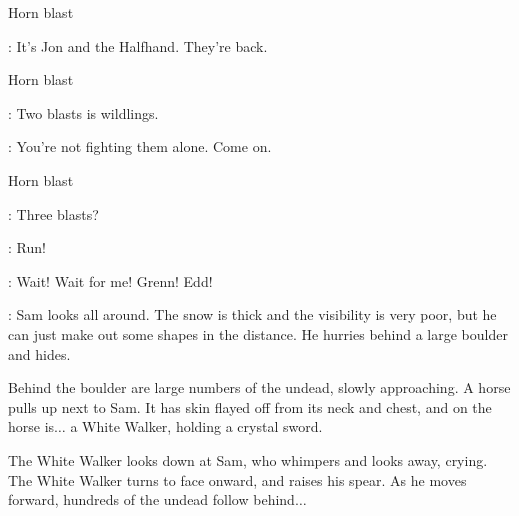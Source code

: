 \sfx Horn blast

\SAM: It's Jon and the Halfhand. They're back.

\sfx Horn blast 

\GRENN:  Two blasts is wildlings. 

\EDD: You're not fighting them alone. Come on. 

\sfx Horn blast


\GRENN: Three blasts? 

\EDD:  Run! 


\SAM:  Wait! Wait for me!  Grenn! Edd! 


\NARRATOR: Sam looks all around. The snow is thick and the visibility is very poor, but he can just make out some shapes in the distance. He hurries behind a large boulder and hides. 

\n Behind the boulder are large numbers of the undead, slowly approaching. A horse pulls up next to Sam. It has skin flayed off from its neck and chest, and on the horse is$\ldots$ a White Walker, holding a crystal sword.

\n The White Walker looks down at Sam, who whimpers and looks away, crying. The White Walker turns to face onward, and raises his spear. As he moves forward, hundreds of the undead follow behind$\ldots$


